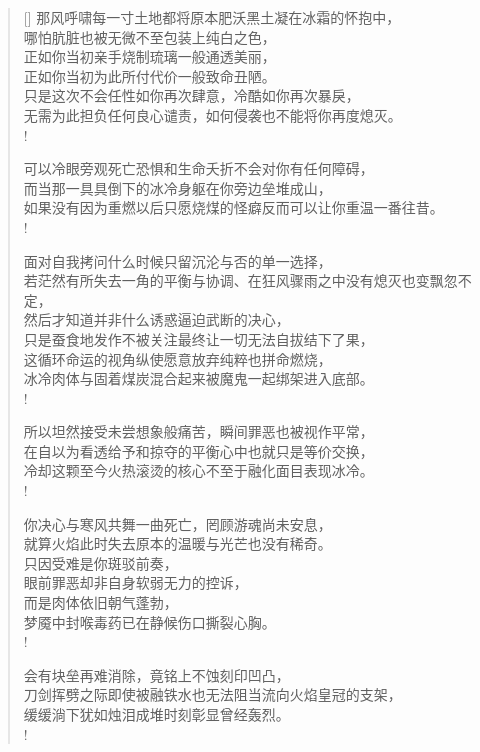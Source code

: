 \documentclass[UTF8, 12pt, a4paper]{ctexrep} %
\begin{document}
\begin{verse}[\versewidth]
那风呼啸每一寸土地都将原本肥沃黑土凝在冰霜的怀抱中，\\
哪怕肮脏也被无微不至包装上纯白之色，\\
正如你当初亲手烧制琉璃一般通透美丽，\\
正如你当初为此所付代价一般致命丑陋。\\
只是这次不会任性如你再次肆意，冷酷如你再次暴戾，\\
无需为此担负任何良心谴责，如何侵袭也不能将你再度熄灭。\\!

可以冷眼旁观死亡恐惧和生命夭折不会对你有任何障碍，\\
而当那一具具倒下的冰冷身躯在你旁边垒堆成山，\\
如果没有因为重燃以后只愿烧煤的怪癖反而可以让你重温一番往昔。\\!

面对自我拷问什么时候只留沉沦与否的单一选择，\\
若茫然有所失去一角的平衡与协调、在狂风骤雨之中没有熄灭也变飘忽不定，\\
然后才知道并非什么诱惑逼迫武断的决心，\\
只是蚕食地发作不被关注最终让一切无法自拔结下了果，\\
这循环命运的视角纵使愿意放弃纯粹也拼命燃烧，\\
冰冷肉体与固着煤炭混合起来被魔鬼一起绑架进入底部。\\!

所以坦然接受未尝想象般痛苦，瞬间罪恶也被视作平常，\\
在自以为看透给予和掠夺的平衡心中也就只是等价交换，\\
冷却这颗至今火热滚烫的核心不至于融化面目表现冰冷。\\!

你决心与寒风共舞一曲死亡，罔顾游魂尚未安息，\\
就算火焰此时失去原本的温暖与光芒也没有稀奇。\\
只因受难是你斑驳前奏，\\
眼前罪恶却非自身软弱无力的控诉，\\
而是肉体依旧朝气蓬勃，\\
梦魇中封喉毒药已在静候伤口撕裂心胸。\\!

会有块垒再难消除，竟铭上不蚀刻印凹凸，\\
刀剑挥劈之际即使被融铁水也无法阻当流向火焰皇冠的支架，\\
缓缓淌下犹如烛泪成堆时刻彰显曾经轰烈。\\!


\end{verse}
\end{document}
